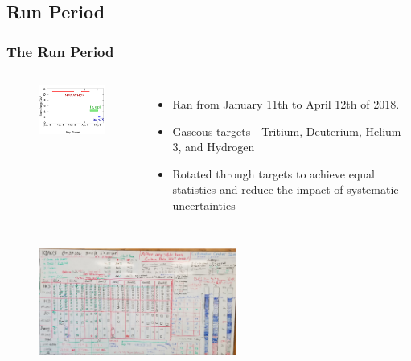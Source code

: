 \documentclass[12pt,usenames,dvipsnames]{beamer}
\begin{document}
\subsection[Run Period]{Run Period}
\begin{frame}
\frametitle{The Run Period}
\vspace{-20pt}
\begin{columns}
	\begin{figure}
		\includegraphics[width=4.5cm]{../images/run_per}
	\end{figure}
	\vspace{-10pt}
	\begin{itemize}
		\item Ran from January 11th to April 12th of 2018.
		\item Gaseous targets - Tritium, Deuterium, Helium-3, and Hydrogen
		\item Rotated through targets to achieve equal statistics and reduce the impact of systematic uncertainties
	\end{itemize}
\end{columns}
\begin{figure}
	\includegraphics[width=6.5cm]{../images/whiteboard_2_20}
\end{figure}
\end{frame}
\end{document}
